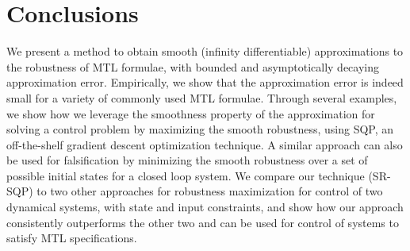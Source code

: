 \section{Conclusions}
We present a method to obtain smooth (infinity differentiable) approximations to the robustness of MTL formulae, with bounded and asymptotically decaying approximation error. 
Empirically, we show that the approximation error is indeed small for a variety of commonly used MTL formulae. 
Through several examples, we show how we leverage the smoothness property of the approximation for solving a control problem by maximizing the smooth robustness, using SQP, an off-the-shelf gradient descent optimization technique. A similar approach can also be used for falsification by minimizing the smooth robustness over a set of possible initial states for a closed loop system. We compare our technique (SR-SQP) to two other approaches for robustness maximization for control of two dynamical systems, with state and input constraints, and show how our approach consistently outperforms the other two and can be used for control of systems to satisfy MTL specifications.

